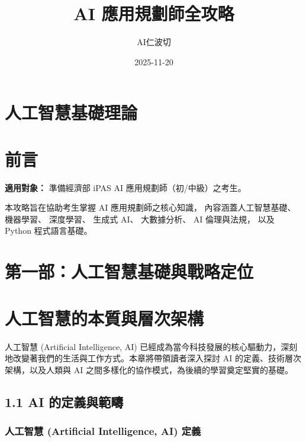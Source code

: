 \documentclass[
  letterpaper,
  DIV=11,
  numbers=noendperiod]{scrreprt}
\title{AI 應用規劃師全攻略}
\author{AI仁波切}
\date{2025-11-20}
\renewcommand*\contentsname{Table of contents}
\newcommand\contentsname{Table of contents}
\begin{document}
\maketitle

\renewcommand*\contentsname{Table of contents}
{
\hypersetup{linkcolor=}
\setcounter{tocdepth}{2}
\tableofcontents
}


\part{人工智慧基礎理論}\label{ux4ebaux5de5ux667aux6167ux57faux790eux7406ux8ad6}


\part*{前言}\label{ux524dux8a00}


\textbf{適用對象：} 準備經濟部 iPAS AI 應用規劃師（初/中級）之考生。

本攻略旨在協助考生掌握 AI 應用規劃師之核心知識， 內容涵蓋人工智慧基礎、
機器學習、 深度學習、 生成式 AI、 大數據分析、 AI 倫理與法規， 以及
Python 程式語言基礎。

\part{第一部：人工智慧基礎與戰略定位}

\part{人工智慧的本質與層次架構}\label{ux4ebaux5de5ux667aux6167ux7684ux672cux8ceaux8207ux5c64ux6b21ux67b6ux69cb}

人工智慧 (Artificial Intelligence, AI)
已經成為當今科技發展的核心驅動力，深刻地改變著我們的生活與工作方式。本章將帶領讀者深入探討
AI 的定義、技術層次架構，以及人類與 AI
之間多樣化的協作模式，為後續的學習奠定堅實的基礎。

\chapter{1.1 AI
的定義與範疇}\label{ai-ux7684ux5b9aux7fa9ux8207ux7bc4ux7587}

\section{人工智慧 (Artificial Intelligence, AI) 定義}\label{sec-ai-def}
\end{document}
